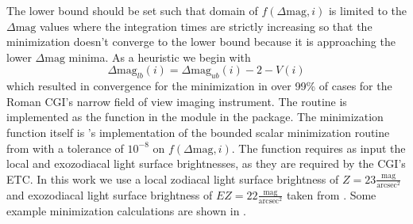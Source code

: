 The lower bound should be set such that domain of $f\left(\Delta\textrm{mag},
i\right)$ is limited to the $\Delta\textrm{mag}$ values where the integration
times are strictly increasing so that the minimization doesn't converge to the
lower bound because it is approaching the lower $\Delta\textrm{mag}$ minima. As
a heuristic we begin with
\begin{equation}
  \Delta\textrm{mag}_{lb}(i) = \Delta\textrm{mag}_{ub}(i) - 2 - V(i)
  \label{eq:dMag_lb}
\end{equation}
which resulted in convergence for the minimization in over 99\% of cases for
the Roman CGI's narrow field of view imaging instrument. The routine is implemented
as the  function in the 
module in the  package. The minimization function itself
is 's \citep{virtanenSciPyFundamental2020} implementation of the
bounded scalar minimization routine from \citet{forsytheComputerMethods1977}
with a tolerance of $10^{-8}$ on $f(\Delta\textrm{mag}, i)$. The function
requires as input the local and exozodiacal light surface brightnesses,
as they are required by the CGI's ETC. In this work we use a local zodiacal
light surface brightness of $Z=23
\frac{\textrm{mag}}{\textrm{arcsec}^2}$ and exozodiacal light surface
brightness of $EZ=22 \frac{\textrm{mag}}{\textrm{arcsec}^2}$
taken from \citet{starkMaximizingExoEarthCandidate2014}. Some example
minimization calculations are shown in .
